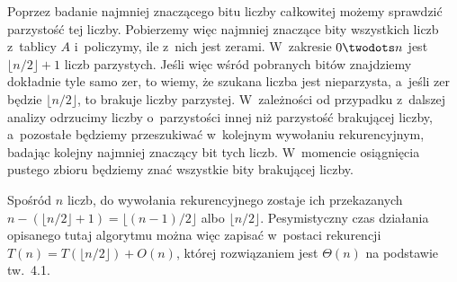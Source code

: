 Poprzez badanie najmniej znaczącego bitu liczby całkowitej możemy sprawdzić parzystość tej liczby.
Pobierzemy więc najmniej znaczące bity wszystkich liczb z~tablicy $A$ i~policzymy, ile z~nich jest zerami.
W~zakresie $0\twodots n$ jest $\lfloor n/2\rfloor+1$ liczb parzystych.
Jeśli więc wśród pobranych bitów znajdziemy dokładnie tyle samo zer, to wiemy, że szukana liczba jest nieparzysta, a~jeśli zer będzie $\lfloor n/2\rfloor$, to brakuje liczby parzystej.
W~zależności od przypadku z~dalszej analizy odrzucimy liczby o~parzystości innej niż parzystość brakującej liczby, a~pozostałe będziemy przeszukiwać w~kolejnym wywołaniu rekurencyjnym, badając kolejny najmniej znaczący bit tych liczb.
W~momencie osiągnięcia pustego zbioru będziemy znać wszystkie bity brakującej liczby.

Spośród $n$ liczb, do wywołania rekurencyjnego zostaje ich przekazanych $n-(\lfloor n/2\rfloor+1)=\lfloor(n-1)/2\rfloor$ albo $\lfloor n/2\rfloor$.
Pesymistyczny czas działania opisanego tutaj algorytmu można więc zapisać w~postaci rekurencji $T(n)=T(\lfloor n/2\rfloor)+O(n)$, której rozwiązaniem jest $\Theta(n)$ na podstawie tw.\ 4.1.

